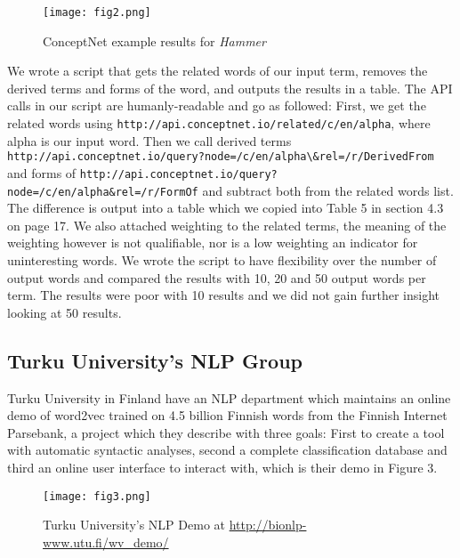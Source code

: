\documentclass[12pt, usenames, dvipsnames]{report}
\begin{document}
\begin{flushleft}
\vspace*{0.2em}
\begin{figure}[!htbp]
  \hspace*{11em}
  \texttt{[image: fig2.png]}
  \caption{ConceptNet example results for \emph{Hammer}}
  \label{fig:figure2}
\end{figure}
\vspace*{0.2em}

We wrote a script that gets the related words of our input term, removes the derived terms and forms of the word, and outputs the results in a table.
The API calls in our script are humanly-readable and go as followed:
First, we get the related words using \lstinline{http://api.conceptnet.io/related/c/en/alpha}, where alpha is our input word.
Then we call derived terms \lstinline{http://api.conceptnet.io/query?node=/c/en/alpha\&rel=/r/DerivedFrom} and forms of \lstinline{http://api.conceptnet.io/query?node=/c/en/alpha&rel=/r/FormOf} and subtract both from the related words list.
The difference is output into a table which we copied into Table 5 in section 4.3 on page 17.
We also attached weighting to the related terms, the meaning of the weighting however is not qualifiable, nor is a low weighting an indicator for uninteresting words.
We wrote the script to have flexibility over the number of output words and compared the results with 10, 20 and 50 output words per term.
The results were poor with 10 results and we did not gain further insight looking at 50 results.

\subsection{Turku University’s NLP Group}

Turku University in Finland have an NLP department which maintains an online demo of word2vec trained on 4.5 billion Finnish words from the Finnish Internet Parsebank, a project which they describe with three goals:
First to create a tool with automatic syntactic analyses, second a complete classification database and third an online user interface to interact with, which is their demo in Figure 3.

\vspace*{1.2em}
\begin{figure}[!htbp]
  \hspace*{-3.666em}
  \texttt{[image: fig3.png]}
  \caption{Turku University’s NLP Demo at \url{http://bionlp-www.utu.fi/wv_demo/}}
  \label{fig:figure3}
\end{figure}
\vspace*{1.2em}


\end{flushleft}
\end{document}
